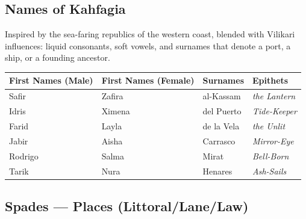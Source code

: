 \subsection*{Names of Kahfagia}
\label{sec:kahfagia-names}

Inspired by the sea-faring republics of the western coast, blended with Vilikari influences: liquid consonants, soft vowels, and surnames that denote a port, a ship, or a founding ancestor.

\begin{longtable}{|p{}|p{}|p{}|p{}|}
\hline
\textbf{First Names (Male)} & \textbf{First Names (Female)} & \textbf{Surnames} & \textbf{Epithets} \\
\hline
Safir & Zafira & al-Kassam & \textit{the Lantern} \\
\hline
Idris & Ximena & del Puerto & \textit{Tide-Keeper} \\
\hline
Farid & Layla & de la Vela & \textit{the Unlit} \\
\hline
Jabir & Aisha & Carrasco & \textit{Mirror-Eye} \\
\hline
Rodrigo & Salma & Mirat & \textit{Bell-Born} \\
\hline
Tarik & Nura & Henares & \textit{Ash-Sails} \\
\hline
\end{longtable}

\subsection*{Spades --- Places (Littoral/Lane/Law)}
\label{sec:kahfagia-places}

